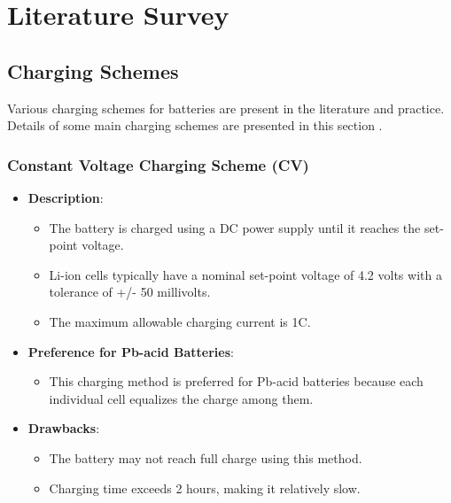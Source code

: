 \documentclass[conference]{IEEEtran}
\begin{document}
\section{Literature Survey}

\subsection{Charging Schemes}
\hspace{0.5cm}Various charging schemes for batteries are present in the 
literature and practice. Details of some main charging 
schemes are presented in this section \cite{Kodali2020}. 
\subsubsection{Constant Voltage Charging Scheme (CV) }
\begin{itemize}
    \item \textbf{Description}:
    \begin{itemize}
        \item The battery is charged using a DC power supply until it reaches the set-point voltage.
        \item Li-ion cells typically have a nominal set-point voltage of 4.2 volts with a tolerance of +/- 50 millivolts.
        \item The maximum allowable charging current is 1C.
    \end{itemize}
    
    \item \textbf{Preference for Pb-acid Batteries}:
    \begin{itemize}
        \item This charging method is preferred for Pb-acid batteries because each individual cell equalizes the charge among them.
    \end{itemize}
    
    \item \textbf{Drawbacks}:
    \begin{itemize}
        \item The battery may not reach full charge using this method.
        \item Charging time exceeds 2 hours, making it relatively slow.
    \end{itemize}
\end{itemize}
\end{document}

